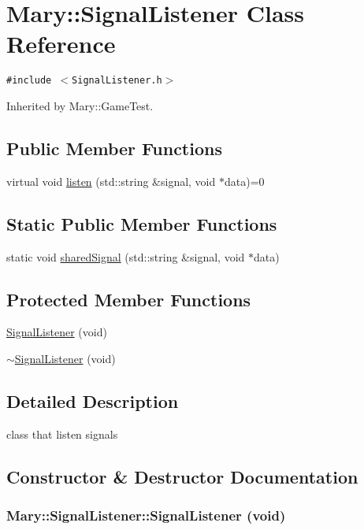 \hypertarget{class_mary_1_1_signal_listener}{
\section{Mary::SignalListener Class Reference}
\label{class_mary_1_1_signal_listener}
}
{\tt \#include $<$SignalListener.h$>$}

Inherited by Mary::GameTest.

\subsection*{Public Member Functions}
\begin{CompactItemize}
\item 
virtual void \hyperlink{class_mary_1_1_signal_listener_48f677603d7a04727da9bd374cb4b6ff}{listen} (std::string \&signal, void $\ast$data)=0
\end{CompactItemize}
\subsection*{Static Public Member Functions}
\begin{CompactItemize}
\item 
static void \hyperlink{class_mary_1_1_signal_listener_68b733fa309d62ada6eb9e3a28ae2dea}{sharedSignal} (std::string \&signal, void $\ast$data)
\end{CompactItemize}
\subsection*{Protected Member Functions}
\begin{CompactItemize}
\item 
\hyperlink{class_mary_1_1_signal_listener_1326cd2fc291aff56cfc14b7e1b10423}{SignalListener} (void)
\item 
\hyperlink{class_mary_1_1_signal_listener_16e4a866d0d8a152affb6f0bc77e78ec}{$\sim$SignalListener} (void)
\end{CompactItemize}


\subsection{Detailed Description}
class that listen signals 

\subsection{Constructor \& Destructor Documentation}
\hypertarget{class_mary_1_1_signal_listener_1326cd2fc291aff56cfc14b7e1b10423}{
\subsubsection[SignalListener]{\setlength{\rightskip}{0pt plus 5cm}Mary::SignalListener::SignalListener (void)}}
\label{class_mary_1_1_signal_listener_1326cd2fc291aff56cfc14b7e1b10423}


